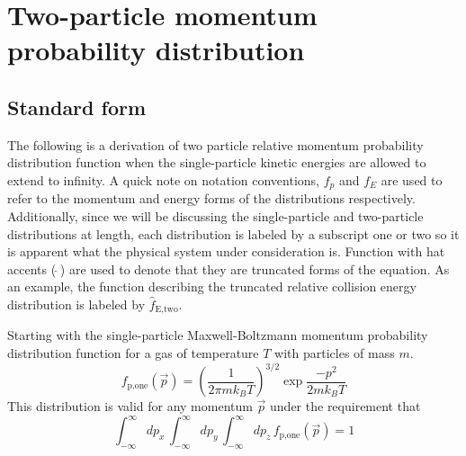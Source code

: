 \chapter{Two-particle momentum probability distribution} \label{app:momDistDer}
\section{Standard form} \label{sec:standardDist}
The following is a derivation of two particle relative momentum probability distribution function when the single-particle kinetic energies are allowed to extend to infinity.
A quick note on notation conventions, $f_p$ and $f_E$ are used to refer to the momentum and energy forms of the distributions respectively.
Additionally, since we will be discussing the single-particle and two-particle distributions at length, each distribution is labeled by a subscript one or two so it is apparent what the physical system under consideration is.
Function with hat accents ($\,\hat{ }\,$) are used to denote that they are truncated forms of the equation.
As an example, the function describing the truncated relative collision energy distribution is labeled by $\hat{f}_\text{E,two}$.

Starting with the single-particle Maxwell-Boltzmann momentum probability distribution function for a gas of temperature $T$ with particles of mass $m$.
\begin{equation} 
\label{eq:single_particle_prob}
		 f_\text{p,one}( \vec{p} ) = \left(\frac{1}{2 \pi m k_B T}\right)^{3/2} \exp{ \frac{-p^2}{2 m k_B T} }
\end{equation}
This distribution is valid for any momentum $\vec{p}$ under the requirement that 
\begin{equation}
	\int_{-\infty}^\infty dp_x \,\int_{-\infty}^\infty dp_y \,\int_{-\infty}^\infty dp_z \, f_\text{p,one}( \vec{p} ) = 1
\end{equation}

